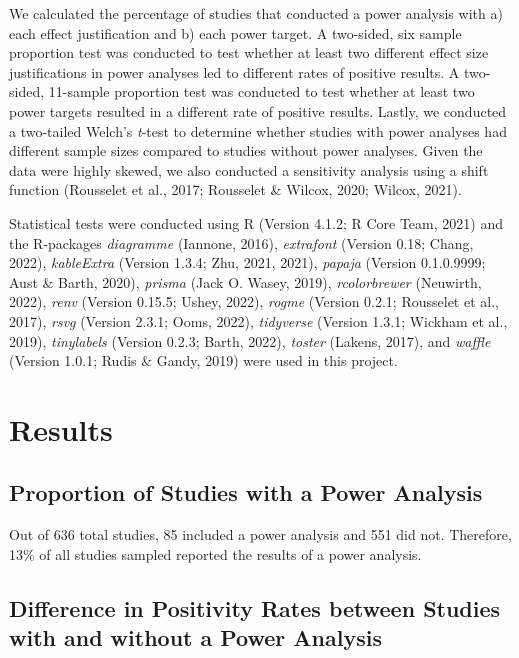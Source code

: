 \documentclass[
  man, donotrepeattitle,mask,floatsintext]{apa7}
\begin{document}
We calculated the percentage of studies that conducted a power analysis with a) each effect justification and b) each power target. A two-sided, six sample proportion test was conducted to test whether at least two different effect size justifications in power analyses led to different rates of positive results. A two-sided, 11-sample proportion test was conducted to test whether at least two power targets resulted in a different rate of positive results. Lastly, we conducted a two-tailed Welch's \emph{t}-test to determine whether studies with power analyses had different sample sizes compared to studies without power analyses. Given the data were highly skewed, we also conducted a sensitivity analysis using a shift function (Rousselet et al., 2017; Rousselet \& Wilcox, 2020; Wilcox, 2021).

Statistical tests were conducted using R (Version 4.1.2; R Core Team, 2021) and the R-packages \emph{diagramme} (Iannone, 2016), \emph{extrafont} (Version 0.18; Chang, 2022), \emph{kableExtra} (Version 1.3.4; Zhu, 2021, 2021), \emph{papaja} (Version 0.1.0.9999; Aust \& Barth, 2020), \emph{prisma} (Jack O. Wasey, 2019), \emph{rcolorbrewer} (Neuwirth, 2022), \emph{renv} (Version 0.15.5; Ushey, 2022), \emph{rogme} (Version 0.2.1; Rousselet et al., 2017), \emph{rsvg} (Version 2.3.1; Ooms, 2022), \emph{tidyverse} (Version 1.3.1; Wickham et al., 2019), \emph{tinylabels} (Version 0.2.3; Barth, 2022), \emph{toster} (Lakens, 2017), and \emph{waffle} (Version 1.0.1; Rudis \& Gandy, 2019) were used in this project.

\hypertarget{results}{%
\section{Results}\label{results}}

\hypertarget{proportion-of-studies-with-a-power-analysis}{%
\subsection{Proportion of Studies with a Power Analysis}\label{proportion-of-studies-with-a-power-analysis}}

Out of 636 total studies, 85 included a power analysis and 551 did not. Therefore, 13\% of all studies sampled reported the results of a power analysis.

\hypertarget{difference-in-positivity-rates-between-studies-with-and-without-a-power-analysis}{%
\subsection{Difference in Positivity Rates between Studies with and without a Power Analysis}\label{difference-in-positivity-rates-between-studies-with-and-without-a-power-analysis}}
\end{document}
